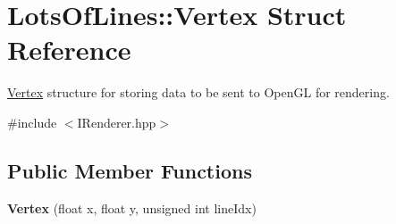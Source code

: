 \hypertarget{struct_lots_of_lines_1_1_vertex}{}\section{Lots\+Of\+Lines\+:\+:Vertex Struct Reference}
\label{struct_lots_of_lines_1_1_vertex}


\hyperlink{struct_lots_of_lines_1_1_vertex}{Vertex} structure for storing data to be sent to Open\+GL for rendering.  




{\ttfamily \#include $<$I\+Renderer.\+hpp$>$}

\subsection*{Public Member Functions}
\begin{DoxyCompactItemize}
\item 
{\bfseries Vertex} (float x, float y, unsigned int line\+Idx)\hypertarget{struct_lots_of_lines_1_1_vertex_a9c84b44d7dce68dfdc8fe910e162a008}{}\label{struct_lots_of_lines_1_1_vertex_a9c84b44d7dce68dfdc8fe910e162a008}

\end{DoxyCompactItemize}
